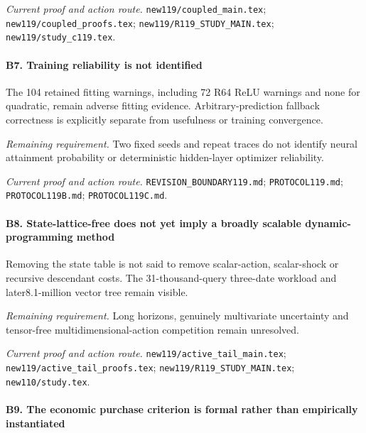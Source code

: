 \par\emph{Current proof and action route.} \nolinkurl{new119/coupled_main.tex}; \nolinkurl{new119/coupled_proofs.tex}; \nolinkurl{new119/R119_STUDY_MAIN.tex}; \nolinkurl{new119/study_c119.tex}.

\paragraph{B7. Training reliability is not identified}

The 104 retained fitting warnings, including 72 R64 ReLU warnings and none for quadratic, remain adverse fitting evidence. Arbitrary-prediction fallback correctness is explicitly separate from usefulness or training convergence.

\par\emph{Remaining requirement.} Two fixed seeds and repeat traces do not identify neural attainment probability or deterministic hidden-layer optimizer reliability.

\par\emph{Current proof and action route.} \nolinkurl{REVISION_BOUNDARY119.md}; \nolinkurl{PROTOCOL119.md}; \nolinkurl{PROTOCOL119B.md}; \nolinkurl{PROTOCOL119C.md}.

\paragraph{B8. State-lattice-free does not yet imply a broadly scalable dynamic-programming method}

Removing the state table is not said to remove scalar-action, scalar-shock or recursive descendant costs. The 31-thousand-query three-date workload and later8.1-million vector tree remain visible.

\par\emph{Remaining requirement.} Long horizons, genuinely multivariate uncertainty and tensor-free multidimensional-action competition remain unresolved.

\par\emph{Current proof and action route.} \nolinkurl{new119/active_tail_main.tex}; \nolinkurl{new119/active_tail_proofs.tex}; \nolinkurl{new119/R119_STUDY_MAIN.tex}; \nolinkurl{new110/study.tex}.

\paragraph{B9. The economic purchase criterion is formal rather than empirically instantiated}

